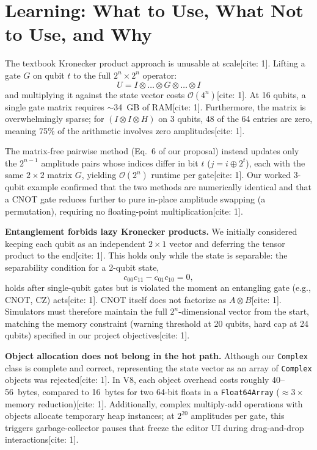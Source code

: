 \documentclass[conference]{IEEEtran}
\begin{document}
\section{Learning: What to Use, What Not to Use, and Why}
\label{sec:learning}
The textbook Kronecker product approach is unusable at scale[cite: 1]. Lifting a gate $G$ on qubit $t$ to the full $2^n \times 2^n$ operator:
\begin{equation}
    U = I \otimes \dots \otimes G \otimes \dots \otimes I
\end{equation}
and multiplying it against the state vector costs $\mathcal{O}(4^n)$[cite: 1]. At 16 qubits, a single gate matrix requires $\sim$34~GB of RAM[cite: 1]. Furthermore, the matrix is overwhelmingly sparse; for $(I \otimes I \otimes H)$ on 3 qubits, 48 of the 64 entries are zero, meaning 75\% of the arithmetic involves zero amplitudes[cite: 1]. 

The matrix-free pairwise method (Eq.~6 of our proposal) instead updates only the $2^{n-1}$ amplitude pairs whose indices differ in bit $t$ ($j = i \oplus 2^t$), each with the same $2 \times 2$ matrix $G$, yielding $\mathcal{O}(2^n)$ runtime per gate[cite: 1]. Our worked 3-qubit example confirmed that the two methods are numerically identical and that a CNOT gate reduces further to pure in-place amplitude swapping (a permutation), requiring no floating-point multiplication[cite: 1].

\textbf{Entanglement forbids lazy Kronecker products.} We initially considered keeping each qubit as an independent $2 \times 1$ vector and deferring the tensor product to the end[cite: 1]. This holds only while the state is separable: the separability condition for a 2-qubit state,
\begin{equation}
    c_{00}c_{11} - c_{01}c_{10} = 0,
\end{equation}
holds after single-qubit gates but is violated the moment an entangling gate (e.g., CNOT, CZ) acts[cite: 1]. CNOT itself does not factorize as $A \otimes B$[cite: 1]. Simulators must therefore maintain the full $2^n$-dimensional vector from the start, matching the memory constraint (warning threshold at 20 qubits, hard cap at 24 qubits) specified in our project objectives[cite: 1].

\textbf{Object allocation does not belong in the hot path.} Although our \texttt{Complex} class is complete and correct, representing the state vector as an array of \texttt{Complex} objects was rejected[cite: 1]. In V8, each object overhead costs roughly 40--56~bytes, compared to 16~bytes for two 64-bit floats in a \texttt{Float64Array} ($\approx 3\times$ memory reduction)[cite: 1]. Additionally, complex multiply-add operations with objects allocate temporary heap instances; at $2^{20}$ amplitudes per gate, this triggers garbage-collector pauses that freeze the editor UI during drag-and-drop interactions[cite: 1]. 
\end{document}
